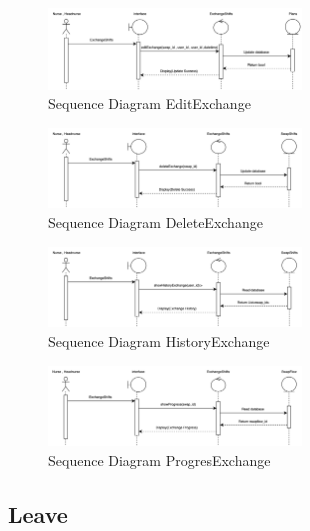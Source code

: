     \begin{figure}[h]
        \centering
        \includegraphics[width=0.6\textwidth]{Sequence 6.2.png}
        \caption{Sequence Diagram EditExchange}
        \end{figure}

    \begin{figure}[h]
    \centering
    \includegraphics[width=0.6\textwidth]{Sequence 6.3.png}
    \caption{Sequence Diagram DeleteExchange}
    \end{figure}

    \begin{figure}[h]
        \centering
        \includegraphics[width=0.6\textwidth]{Sequence 6.4.png}
        \caption{Sequence Diagram HistoryExchange}
        \end{figure}
    
        \begin{figure}[h]
            \centering
            \includegraphics[width=0.6\textwidth]{Sequence 6.5.png}
            \caption{Sequence Diagram ProgresExchange}
            \end{figure}

\subsection{Leave}

